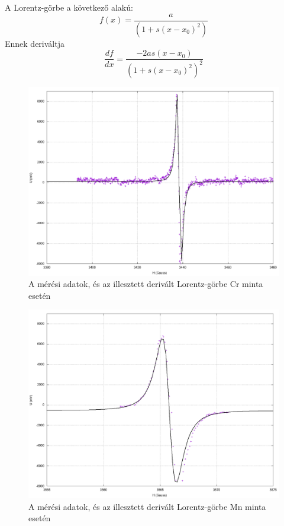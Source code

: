 \documentclass[12pt]{article}
\begin{document}
A Lorentz-görbe a következő alakú:
\[  f(x) = \frac{a}{(1+s(x-x_0)^2)}\]
Ennek deriváltja
\[ \frac{df}{dx} = \frac{-2as(x-x_0)}{(1+s(x-x_0)^2)^2}\]

\begin{figure}[H]
\includegraphics[width=15cm]{cr6.png}
\centering
\caption{A mérési adatok, és az illesztett derivált Lorentz-görbe Cr minta esetén}
\label{fig:3}
\end{figure}

\begin{figure}[H]
\includegraphics[width=15cm]{mn.png}
\centering
\caption{A mérési adatok, és az illesztett derivált Lorentz-görbe Mn minta esetén}
\label{fig:4}
\end{figure}
\end{document}
